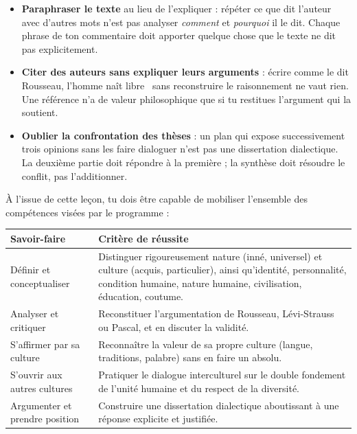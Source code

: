 \documentclass[11pt]{article}
\newcounter{popsec}
\newcounter{popsub}
\newcommand{\courssub}[1]{%
  \stepcounter{popsub}%
  \par\vspace{9pt}\noindent{\popxbold\fontsize{11.5}{13}\selectfont\color{popink}{\color{poporange}\thepopsec.\thepopsub}\hspace{6pt}#1}\par\nopagebreak\vspace{4pt}
}
\begin{document}
\begin{attention}
\begin{itemize}
  \item \textbf{Paraphraser le texte} au lieu de l'expliquer : répéter ce que dit l'auteur avec d'autres mots n'est pas analyser \emph{comment} et \emph{pourquoi} il le dit. Chaque phrase de ton commentaire doit apporter quelque chose que le texte ne dit pas explicitement.
  \item \textbf{Citer des auteurs sans expliquer leurs arguments} : écrire \guillemotleft comme le dit Rousseau, l'homme naît libre \guillemotright\ sans reconstruire le raisonnement ne vaut rien. Une référence n'a de valeur philosophique que si tu restitues l'argument qui la soutient.
  \item \textbf{Oublier la confrontation des thèses} : un plan qui expose successivement trois opinions sans les faire dialoguer n'est pas une dissertation dialectique. La deuxième partie doit répondre à la première ; la synthèse doit résoudre le conflit, pas l'additionner.
\end{itemize}
\end{attention}

\courssub{Bilan des savoir-faire}

À l'issue de cette leçon, tu dois être capable de mobiliser l'ensemble des compétences visées par le programme :

\begin{center}
\begin{tabularx}{\linewidth}{|l|X|}
\hline
\rowcolor{popblueL} \textbf{Savoir-faire} & \textbf{Critère de réussite} \\
\hline
Définir et conceptualiser & Distinguer rigoureusement nature (inné, universel) et culture (acquis, particulier), ainsi qu'identité, personnalité, condition humaine, nature humaine, civilisation, éducation, coutume. \\
\hline
Analyser et critiquer & Reconstituer l'argumentation de Rousseau, Lévi-Strauss ou Pascal, et en discuter la validité. \\
\hline
S'affirmer par sa culture & Reconnaître la valeur de sa propre culture (langue, traditions, palabre) sans en faire un absolu. \\
\hline
S'ouvrir aux autres cultures & Pratiquer le dialogue interculturel sur le double fondement de l'unité humaine et du respect de la diversité. \\
\hline
Argumenter et prendre position & Construire une dissertation dialectique aboutissant à une réponse explicite et justifiée. \\
\hline
\end{tabularx}
\end{center}
\end{document}
